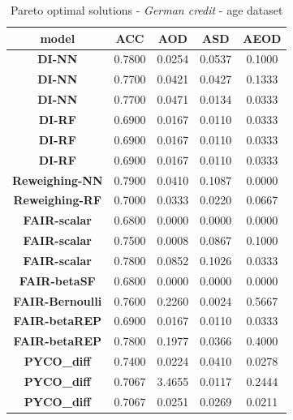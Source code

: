\documentclass[preprint,12pt]{elsarticle}
\begin{document}
\begin{table}
	\centering
	\caption{Pareto optimal solutions - \textit{German credit} - age dataset}
	\begin{tabular}{|c|c|c|c|c|}
		\hline
		\textbf{model}          & \textbf{ACC} & \textbf{AOD} & \textbf{ASD} & \textbf{AEOD} \\ \hline
		\textbf{DI-NN}          & 0.7800       & 0.0254       & 0.0537       & 0.1000        \\ \hline
		\textbf{DI-NN}          & 0.7700       & 0.0421       & 0.0427       & 0.1333        \\ \hline
		\textbf{DI-NN}          & 0.7700       & 0.0471       & 0.0134       & 0.0333        \\ \hline
		\textbf{DI-RF}          & 0.6900       & 0.0167       & 0.0110       & 0.0333        \\ \hline
		\textbf{DI-RF}          & 0.6900       & 0.0167       & 0.0110       & 0.0333        \\ \hline
		\textbf{DI-RF}          & 0.6900       & 0.0167       & 0.0110       & 0.0333        \\ \hline
		\textbf{Reweighing-NN}  & 0.7900       & 0.0410       & 0.1087       & 0.0000        \\ \hline
		\textbf{Reweighing-RF}  & 0.7000       & 0.0333       & 0.0220       & 0.0667        \\ \hline
		\textbf{FAIR-scalar}    & 0.6800       & 0.0000       & 0.0000       & 0.0000        \\ \hline
		\textbf{FAIR-scalar}    & 0.7500       & 0.0008       & 0.0867       & 0.1000        \\ \hline
		\textbf{FAIR-scalar}    & 0.7800       & 0.0852       & 0.1026       & 0.0333        \\ \hline
		\textbf{FAIR-betaSF}    & 0.6800       & 0.0000       & 0.0000       & 0.0000        \\ \hline
		\textbf{FAIR-Bernoulli} & 0.7600       & 0.2260       & 0.0024       & 0.5667        \\ \hline
		\textbf{FAIR-betaREP}   & 0.6900       & 0.0167       & 0.0110       & 0.0333        \\ \hline
		\textbf{FAIR-betaREP}   & 0.7800       & 0.1977       & 0.0366       & 0.4000        \\ \hline
		\textbf{PYCO\_diff}     & 0.7400       & 0.0224       & 0.0410       & 0.0278        \\ \hline
		\textbf{PYCO\_diff}     & 0.7067       & 3.4655       & 0.0117       & 0.2444        \\ \hline
		\textbf{PYCO\_diff}     & 0.7067       & 0.0251       & 0.0269       & 0.0211        \\ \hline
	\end{tabular}
	\label{tab:Ger-age}
\end{table}
\end{document}
